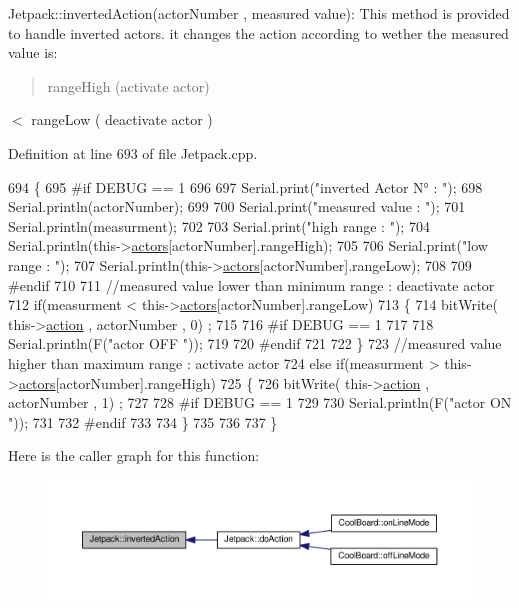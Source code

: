 Jetpack\+::inverted\+Action(actor\+Number , measured value)\+: This method is provided to handle inverted actors. it changes the action according to wether the measured value is\+: \begin{quote}
range\+High (activate actor) \end{quote}
$<$ range\+Low ( deactivate actor ) 

Definition at line 693 of file Jetpack.\+cpp.


\begin{DoxyCode}
694 \{
695 \textcolor{preprocessor}{#if DEBUG == 1}
696     
697     Serial.print(\textcolor{stringliteral}{"inverted Actor N° : "});
698     Serial.println(actorNumber);
699 
700     Serial.print(\textcolor{stringliteral}{"measured value : "});
701     Serial.println(measurment);
702 
703     Serial.print(\textcolor{stringliteral}{"high range : "});
704     Serial.println(this->\hyperlink{class_jetpack_a7e16d2f97837f9712a2e6de1c50d99db}{actors}[actorNumber].rangeHigh);
705 
706     Serial.print(\textcolor{stringliteral}{"low range : "});
707     Serial.println(this->\hyperlink{class_jetpack_a7e16d2f97837f9712a2e6de1c50d99db}{actors}[actorNumber].rangeLow);
708 
709 \textcolor{preprocessor}{#endif}
710 
711     \textcolor{comment}{//measured value lower than minimum range : deactivate actor}
712     \textcolor{keywordflow}{if}(measurment < this->\hyperlink{class_jetpack_a7e16d2f97837f9712a2e6de1c50d99db}{actors}[actorNumber].rangeLow)
713     \{
714         bitWrite( this->\hyperlink{class_jetpack_aca3142925a7b0834b34ae91d26af7765}{action} , actorNumber , 0) ;
715 
716 \textcolor{preprocessor}{    #if DEBUG == 1 }
717 
718         Serial.println(F(\textcolor{stringliteral}{"actor OFF "}));
719     
720 \textcolor{preprocessor}{    #endif}
721 
722     \}
723     \textcolor{comment}{//measured value higher than maximum range : activate actor}
724     \textcolor{keywordflow}{else} \textcolor{keywordflow}{if}(measurment > this->\hyperlink{class_jetpack_a7e16d2f97837f9712a2e6de1c50d99db}{actors}[actorNumber].rangeHigh)
725     \{
726         bitWrite( this->\hyperlink{class_jetpack_aca3142925a7b0834b34ae91d26af7765}{action} , actorNumber , 1) ;
727 
728 \textcolor{preprocessor}{    #if DEBUG == 1 }
729 
730         Serial.println(F(\textcolor{stringliteral}{"actor ON "}));
731     
732 \textcolor{preprocessor}{    #endif}
733 
734     \}
735 
736 
737 \}
\end{DoxyCode}
Here is the caller graph for this function\+:\nopagebreak
\begin{figure}[H]
\begin{center}
\leavevmode
\includegraphics[width=350pt]{df/d1d/class_jetpack_adacfc35fab4a621357caf98ce1c9cb54_icgraph}
\end{center}
\end{figure}
